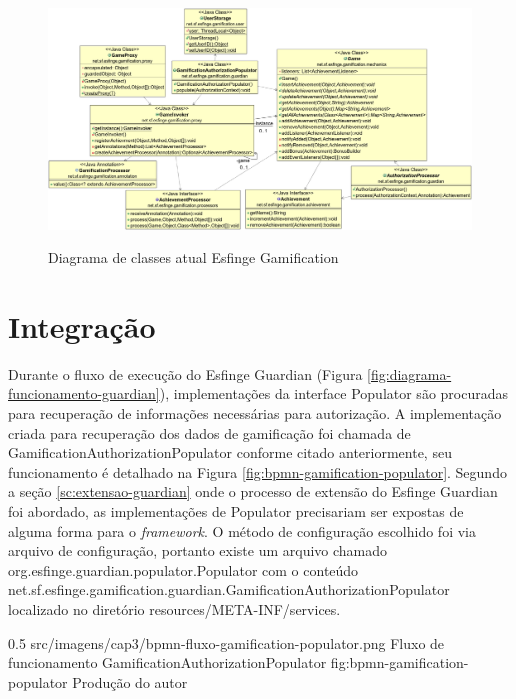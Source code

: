 \begin{landscape}
    \begin{figure}    \caption{Diagrama de classes atual Esfinge Gamification}
    \includegraphics[scale=0.42]{src/imagens/cap3/gamification-class-diagram-cap3.png}
    \label{fig:gamification-diagrama-classe-cap3}
    \end{figure}
\end{landscape}

\section{Integração}

\par Durante o fluxo de execução do Esfinge Guardian (Figura \ref{fig:diagrama-funcionamento-guardian}), implementações da interface Populator são procuradas para recuperação de informações necessárias para autorização. A implementação criada para recuperação dos dados de gamificação foi chamada de GamificationAuthorizationPopulator conforme citado anteriormente, seu funcionamento é detalhado na Figura \ref{fig:bpmn-gamification-populator}. Segundo a seção \ref{sc:extensao-guardian} onde o processo de extensão do Esfinge Guardian foi abordado, as implementações de Populator precisariam ser expostas de alguma forma para o \textit{framework}. O método de configuração escolhido foi via arquivo de configuração, portanto existe um arquivo chamado org.esfinge.guardian.populator.Populator com o conteúdo net.sf.esfinge.gamification.guardian.GamificationAuthorizationPopulator localizado no diretório resources/META-INF/services.

\begin{image}
{0.5}
{src/imagens/cap3/bpmn-fluxo-gamification-populator.png}
{Fluxo de funcionamento GamificationAuthorizationPopulator}
{fig:bpmn-gamification-populator}
{Produção do autor}
\end{image}

